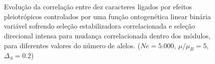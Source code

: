\begin{figure}[htbp]
  \\
  \vspace{-18pt}
  \vspace{11pt}
  \\
  \caption{Evolução da correlação entre dez caracteres ligados por efeitos
  pleiotrópicos controlados por uma função ontogenética linear binária
  variável sofrendo seleção estabilizadora correlacionada e seleção
  direcional intensa para mudança correlacionada dentro dos módulos,
  para diferentes valores do número de alelos. ($Ne=5.000$, $\mu/\mu_B=5$, $\Delta_S=0.2$)}
  \label{MB}
\end{figure}
